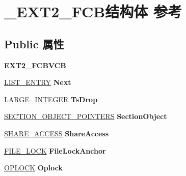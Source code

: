 \hypertarget{struct___e_x_t2___f_c_b}{}\section{\+\_\+\+E\+X\+T2\+\_\+\+F\+C\+B结构体 参考}
\label{struct___e_x_t2___f_c_b}
\subsection*{Public 属性}
\begin{DoxyCompactItemize}
\item 
\mbox{\label{struct___e_x_t2___f_c_b_ad98c2ab9b1870b23674b07ea97550abc}} 
{\bfseries E\+X\+T2\+\_\+\+F\+C\+B\+V\+CB}
\item 
\mbox{\label{struct___e_x_t2___f_c_b_ab7df327a6cbcf5ed744e015ff6cc10f2}} 
\hyperlink{struct___l_i_s_t___e_n_t_r_y}{L\+I\+S\+T\+\_\+\+E\+N\+T\+RY} {\bfseries Next}
\item 
\mbox{\label{struct___e_x_t2___f_c_b_a477335d3a45cd22459c500c3e17b615c}} 
\hyperlink{union___l_a_r_g_e___i_n_t_e_g_e_r}{L\+A\+R\+G\+E\+\_\+\+I\+N\+T\+E\+G\+ER} {\bfseries Ts\+Drop}
\item 
\mbox{\label{struct___e_x_t2___f_c_b_a4698b235b71c0b7a1ceb13ce8d8817c8}} 
\hyperlink{struct___s_e_c_t_i_o_n___o_b_j_e_c_t___p_o_i_n_t_e_r_s}{S\+E\+C\+T\+I\+O\+N\+\_\+\+O\+B\+J\+E\+C\+T\+\_\+\+P\+O\+I\+N\+T\+E\+RS} {\bfseries Section\+Object}
\item 
\mbox{\label{struct___e_x_t2___f_c_b_aa62ac5f325acca3d94a201d47f73bd74}} 
\hyperlink{struct___s_h_a_r_e___a_c_c_e_s_s}{S\+H\+A\+R\+E\+\_\+\+A\+C\+C\+E\+SS} {\bfseries Share\+Access}
\item 
\mbox{\label{struct___e_x_t2___f_c_b_ab58fba7e91d01e866e6dcf13a2ce6642}} 
\hyperlink{struct___f_i_l_e___l_o_c_k}{F\+I\+L\+E\+\_\+\+L\+O\+CK} {\bfseries File\+Lock\+Anchor}
\item 
\mbox{\label{struct___e_x_t2___f_c_b_a4a22d2e082ee26081affff3cdc141061}} 
\hyperlink{interfacevoid}{O\+P\+L\+O\+CK} {\bfseries Oplock}

\end{DoxyCompactItemize}
